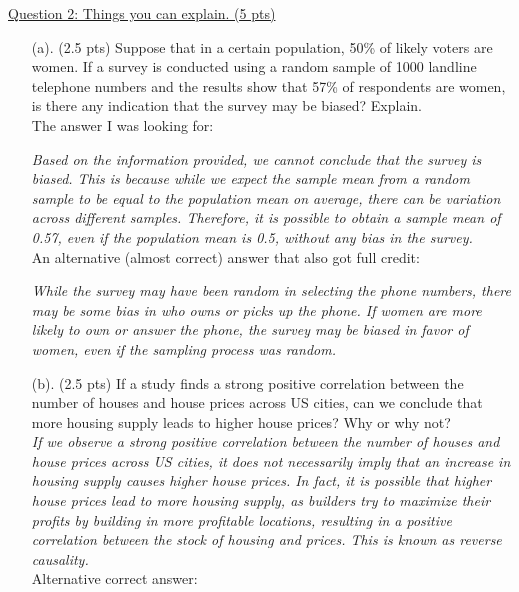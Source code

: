 \documentclass{./../../Latex/tests}
\begin{document}
\underline{Question 2: Things you can explain. (5 pts)}
\begin{enumerate}

\item[(a).] (2.5 pts) Suppose that in a certain population, 50\% of likely voters are women. If a survey is conducted using a random sample of 1000 landline telephone numbers and the results show that 57\% of respondents are women, is there any indication that the survey may be biased? Explain. \\

The answer I was looking for:

\textit{Based on the information provided, we cannot conclude that the survey is biased. This is because while we expect the sample mean from a random sample to be equal to the population mean on average, there can be variation across different samples. Therefore, it is possible to obtain a sample mean of 0.57, even if the population mean is 0.5, without any bias in the survey.} \\

An alternative (almost correct) answer that also got full credit:

\textit{While the survey may have been random in selecting the phone numbers, there may be some bias in who owns or picks up the phone. If women are more likely to own or answer the phone, the survey may be biased in favor of women, even if the sampling process was random.} \\

\item[(b).] (2.5 pts) If a study finds a strong positive correlation between the number of houses and house prices across US cities, can we conclude that more housing supply leads to higher house prices? Why or why not? \\

\textit{If we observe a strong positive correlation between the number of houses and house prices across US cities, it does not necessarily imply that an increase in housing supply causes higher house prices. In fact, it is possible that higher house prices lead to more housing supply, as builders try to maximize their profits by building in more profitable locations, resulting in a positive correlation between the stock of housing and prices. This is known as reverse causality.} \\

Alternative correct answer:


\end{enumerate}
\end{document}
